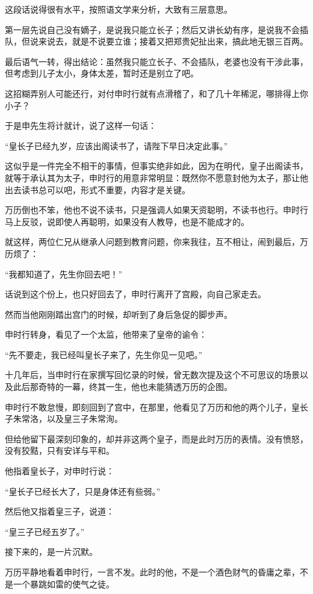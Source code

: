 \begin{multicols}{\theparacolNo}
这段话说得很有水平，按照语文学来分析，大致有三层意思。

第一层先说自己没有嫡子，是说我只能立长子；然后又讲长幼有序，是说我不会插队，但说来说去，就是不说要立谁；接着又把郑贵妃扯出来，搞此地无银三百两。

最后语气一转，得出结论：虽然我只能立长子、不会插队，老婆也没有干涉此事，但考虑到儿子太小，身体太差，暂时还是别立了吧。

这招糊弄别人可能还行，对付申时行就有点滑稽了，和了几十年稀泥，哪排得上你小子？

于是申先生将计就计，说了这样一句话：

“皇长子已经九岁，应该出阁读书了，请陛下早日决定此事。”

这似乎是一件完全不相干的事情，但事实绝非如此，因为在明代，皇子出阁读书，就等于承认其为太子，申时行的用意非常明显：既然你不愿意封他为太子，那让他出去读书总可以吧，形式不重要，内容才是关键。

万历倒也不笨，他也不说不读书，只是强调人如果天资聪明，不读书也行。申时行马上反驳，说即使人再聪明，如果没有人教导，也是不能成才的。

就这样，两位仁兄从继承人问题到教育问题，你来我往，互不相让，闹到最后，万历烦了：

“我都知道了，先生你回去吧！”

话说到这个份上，也只好回去了，申时行离开了宫殿，向自己家走去。

然而当他刚刚踏出宫门的时候，却听到了身后急促的脚步声。

申时行转身，看见了一个太监，他带来了皇帝的谕令：

“先不要走，我已经叫皇长子来了，先生你见一见吧。”

十几年后，当申时行在家撰写回忆录的时候，曾无数次提及这个不可思议的场景以及此后那奇特的一幕，终其一生，他也未能猜透万历的企图。

申时行不敢怠慢，即刻回到了宫中，在那里，他看见了万历和他的两个儿子，皇长子朱常洛，以及皇三子朱常洵。

但给他留下最深刻印象的，却并非这两个皇子，而是此时万历的表情。没有愤怒，没有狡黠，只有安详与平和。

他指着皇长子，对申时行说：

“皇长子已经长大了，只是身体还有些弱。”

然后他又指着皇三子，说道：

“皇三子已经五岁了。”

接下来的，是一片沉默。

万历平静地看着申时行，一言不发。此时的他，不是一个酒色财气的昏庸之辈，不是一个暴跳如雷的使气之徒。


\end{multicols}
